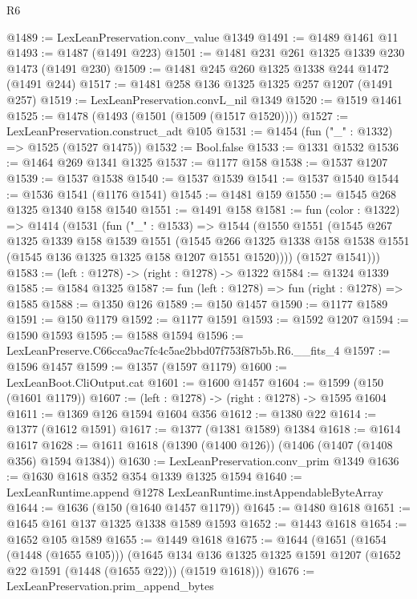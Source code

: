 \begin{lexlean}{R6}
\begin{coremodule}
@1489 := LexLeanPreservation.conv_value @1349
@1491 := @1489 @1461 @11
@1493 := @1487 (@1491 @223)
@1501 := @1481 @231 @261 @1325 @1339 @230 @1473 (@1491 @230)
@1509 := @1481 @245 @260 @1325 @1338 @244 @1472 (@1491 @244)
@1517 := @1481 @258 @136 @1325 @1325 @257 @1207 (@1491 @257)
@1519 := LexLeanPreservation.convL_nil @1349
@1520 := @1519 @1461
@1525 := @1478 (@1493 (@1501 (@1509 (@1517 @1520))))
@1527 := LexLeanPreservation.construct_adt @105
@1531 := @1454 (fun ("_" : @1332) => @1525 (@1527 @1475))
@1532 := Bool.false
@1533 := @1331 @1532
@1536 := @1464 @269 @1341 @1325
@1537 := @1177 @158
@1538 := @1537 @1207
@1539 := @1537 @1538
@1540 := @1537 @1539
@1541 := @1537 @1540
@1544 := @1536 @1541 (@1176 @1541)
@1545 := @1481 @159
@1550 := @1545 @268 @1325 @1340 @158 @1540
@1551 := @1491 @158
@1581 := fun (color : @1322) =>
  @1414
    (@1531
      (fun ("_" : @1533) =>
      @1544
        (@1550
          @1551
          (@1545
            @267
            @1325
            @1339
            @158
            @1539
            @1551
            (@1545
              @266
              @1325
              @1338
              @158
              @1538
              @1551
              (@1545 @136 @1325 @1325 @158 @1207 @1551 @1520))))
        (@1527 @1541)))
@1583 := (left : @1278) -> (right : @1278) -> @1322
@1584 := @1324 @1339
@1585 := @1584 @1325
@1587 := fun (left : @1278) => fun (right : @1278) => @1585
@1588 := @1350 @126
@1589 := @150 @1457
@1590 := @1177 @1589
@1591 := @150 @1179
@1592 := @1177 @1591
@1593 := @1592 @1207
@1594 := @1590 @1593
@1595 := @1588 @1594
@1596 := LexLeanPreserve.C66cca9ac7fc4c5ae2bbd07f753f87b5b.R6.__fits_4
@1597 := @1596 @1457
@1599 := @1357 (@1597 @1179)
@1600 := LexLeanBoot.CliOutput.cat
@1601 := @1600 @1457
@1604 := @1599 (@150 (@1601 @1179))
@1607 := (left : @1278) -> (right : @1278) -> @1595 @1604
@1611 := @1369 @126 @1594 @1604 @356
@1612 := @1380 @22
@1614 := @1377 (@1612 @1591)
@1617 := @1377 (@1381 @1589) @1384
@1618 := @1614 @1617
@1628 := @1611 @1618 (@1390 (@1400 @126)) (@1406 (@1407 (@1408 @356) @1594 @1384))
@1630 := LexLeanPreservation.conv_prim @1349
@1636 := @1630 @1618 @352 @354 @1339 @1325 @1594
@1640 := LexLeanRuntime.append @1278 LexLeanRuntime.instAppendableByteArray
@1644 := @1636 (@150 (@1640 @1457 @1179))
@1645 := @1480 @1618
@1651 := @1645 @161 @137 @1325 @1338 @1589 @1593
@1652 := @1443 @1618
@1654 := @1652 @105 @1589
@1655 := @1449 @1618
@1675 := @1644
    (@1651
      (@1654 (@1448 (@1655 @105)))
      (@1645 @134 @136 @1325 @1325 @1591 @1207 (@1652 @22 @1591 (@1448 (@1655 @22))) (@1519 @1618)))
@1676 := LexLeanPreservation.prim_append_bytes

\end{coremodule}
\end{lexlean}
